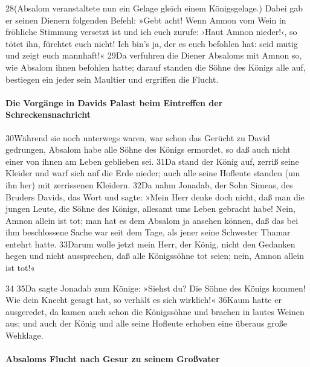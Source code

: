 28(Absalom veranstaltete nun ein Gelage gleich einem Königsgelage.)
Dabei gab er seinen Dienern folgenden Befehl: »Gebt acht! Wenn Amnon vom
Wein in fröhliche Stimmung versetzt ist und ich euch zurufe: ›Haut Amnon
nieder!‹, so tötet ihn, fürchtet euch nicht! Ich bin's ja, der es euch
befohlen hat: seid mutig und zeigt euch mannhaft!« 29Da verfuhren die
Diener Absaloms mit Amnon so, wie Absalom ihnen befohlen hatte; darauf
standen die Söhne des Königs alle auf, bestiegen ein jeder sein Maultier
und ergriffen die Flucht.

\hypertarget{die-vorguxe4nge-in-davids-palast-beim-eintreffen-der-schreckensnachricht}{%
\paragraph{Die Vorgänge in Davids Palast beim Eintreffen der
Schreckensnachricht}\label{die-vorguxe4nge-in-davids-palast-beim-eintreffen-der-schreckensnachricht}}

30Während sie noch unterwegs waren, war schon das Gerücht zu David
gedrungen, Absalom habe alle Söhne des Königs ermordet, so daß auch
nicht einer von ihnen am Leben geblieben sei. 31Da stand der König auf,
zerriß seine Kleider und warf sich auf die Erde nieder; auch alle seine
Hofleute standen (um ihn her) mit zerrissenen Kleidern. 32Da nahm
Jonadab, der Sohn Simeas, des Bruders Davids, das Wort und sagte: »Mein
Herr denke doch nicht, daß man die jungen Leute, die Söhne des Königs,
allesamt ums Leben gebracht habe! Nein, Amnon allein ist tot; man hat es
dem Absalom ja ansehen können, daß das bei ihm beschlossene Sache war
seit dem Tage, als jener seine Schwester Thamar entehrt hatte. 33Darum
wolle jetzt mein Herr, der König, nicht den Gedanken hegen und nicht
aussprechen, daß alle Königssöhne tot seien; nein, Amnon allein ist
tot!«

34 35Da sagte Jonadab zum Könige: »Siehst du? Die Söhne des Königs
kommen! Wie dein Knecht gesagt hat, so verhält es sich wirklich!« 36Kaum
hatte er ausgeredet, da kamen auch schon die Königssöhne und brachen in
lautes Weinen aus; und auch der König und alle seine Hofleute erhoben
eine überaus große Wehklage.

\hypertarget{absaloms-flucht-nach-gesur-zu-seinem-grouxdfvater}{%
\paragraph{Absaloms Flucht nach Gesur zu seinem
Großvater}\label{absaloms-flucht-nach-gesur-zu-seinem-grouxdfvater}}

